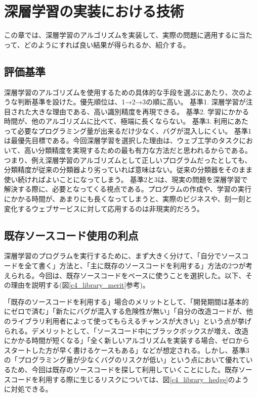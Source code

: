 \chapter{深層学習の実装における技術}
この章では、深層学習のアルゴリズムを実装して、実際の問題に適用するに当たって、どのようにすれば良い結果が得られるか、紹介する。
\section{評価基準}
深層学習のアルゴリズムを使用するための具体的な手段を選ぶにあたり、次のような判断基準を設けた。優先順位は、1→2→3の順に高い。
基準1. 深層学習が注目された大きな理由である、高い識別精度を再現できる。
基準2. 学習にかかる時間が、他のアルゴリズムに比べて、極端に長くならない。
基準3. 利用にあたって必要なプログラミング量が出来るだけ少なく、バグが混入しにくい。
基準1は最優先目標である。今回深層学習を選択した理由は、ウェブ工学のタスクにおいて、高い分類精度を実現するための最も有力な方法だと思われるからである。つまり、例え深層学習のアルゴリズムとして正しいプログラムだったとしても、分類精度が従来の分類器より劣っていれば意味はない。従来の分類器をそのまま使い続ければよいことになってしまう。
基準2と3は、現実の問題を深層学習で解決する際に、必要となってくる視点である。プログラムの作成や、学習の実行にかかる時間が、あまりにも長くなってしまうと、実際のビジネスや、刻一刻と変化するウェブサービスに対して応用するのは非現実的だろう。
\section{既存ソースコード使用の利点}
深層学習のプログラムを実行するために、まず大きく分けて、「自分でソースコードを全て書く」方法と、「主に既存のソースコードを利用する」方法の2つが考えられる。今回は、既存ソースコードをベースに使うことを選択した。以下、その理由を説明する(図\ref{c4_library_merit}参考)。\par
「既存のソースコードを利用する」場合のメリットとして、「開発期間は基本的にゼロで済む」「新たにバグが混入する危険性が無い」「自分の改造コードが、他のライブラリ利用者によって使ってもらえるチャンスが大きい」という点が挙げられる。デメリットとして、「ソースコード中にブラックボックスが増え、改造にかかる時間が短くなる」「全く新しいアルゴリズムを実装する場合、ゼロからスタートした方が早く書けるケースもある」などが想定される。しかし、基準3の「プログラミング量が少なくバグのリスクが低い」という点において優れているため、今回は既存のソースコードを探して利用していくことにした。既存ソースコードを利用する際に生じるリスクについては、図\ref{c4_library_hedge}のように対処できる。\par

